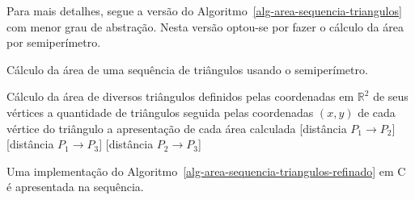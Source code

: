 \documentclass[
  11pt,
  a4paper,
]{scrbook}
\begin{document}
Para mais detalhes, segue a versão do
Algoritmo~\ref{alg-area-sequencia-triangulos} com menor grau de
abstração. Nesta versão optou-se por fazer o cálculo da área por
semiperímetro.

\begin{algorithm}[H]
\caption{\label{alg-area-sequencia-triangulos-refinado}Cálculo da área
de uma sequência de triângulos usando o semiperímetro.}
\begingroup%


\begin{algorithmic}
    \Description Cálculo da área de diversos triângulos definidos pelas coordenadas em $\mathbb{R}^2$ de seus vértices
    \Require a quantidade de triângulos seguida pelas coordenadas $(x,y)$ de cada vértice do triângulo
    \Ensure a apresentação de cada área calculada
    \Statex{}
        \Statex
        [distância $P_1 \rightarrow P_2$]
        [distância $P_1 \rightarrow P_3$]
        [distância $P_2 \rightarrow P_3$]
        \Statex
    \EndFor
\end{algorithmic}

\endgroup
\end{algorithm}

Uma implementação do
Algoritmo~\ref{alg-area-sequencia-triangulos-refinado} em C é
apresentada na sequência.
\end{document}

